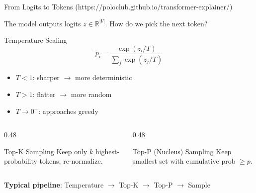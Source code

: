 \documentclass[aspectratio=169, 11pt]{beamer}
\begin{document}
\begin{frame}{From Logits to Tokens (https://poloclub.github.io/transformer-explainer/)}

	The model outputs logits $z \in \mathbb{R}^{|V|}$. How do we pick the next token?

	\begin{block}{Temperature Scaling}
		$$\tilde{p}_i = \frac{\exp(z_i / T)}{\sum_j \exp(z_j / T)}$$
		\begin{itemize}
			\item $T < 1$: sharper $\rightarrow$ more deterministic
			\item $T > 1$: flatter $\rightarrow$ more random
			\item $T \to 0^+$: approaches greedy
		\end{itemize}
	\end{block}

	\begin{columns}[T]
		\begin{column}{0.48\textwidth}
			\begin{block}{Top-K Sampling}
				Keep only $k$ highest-probability tokens, re-normalize.
			\end{block}
		\end{column}
		\begin{column}{0.48\textwidth}
			\begin{block}{Top-P (Nucleus) Sampling}
				Keep smallest set with cumulative prob $\geq p$.
			\end{block}
		\end{column}
	\end{columns}

	\textbf{Typical pipeline}: Temperature $\rightarrow$ Top-K $\rightarrow$ Top-P $\rightarrow$ Sample

\end{frame}
\end{document}
